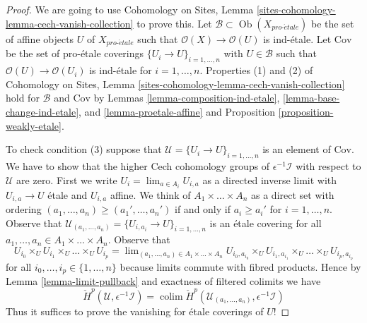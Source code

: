 \documentclass[10pt,a4paper]{amsart}
\theoremstyle{plain}
\theoremstyle{definition}
\theoremstyle{remark}
\numberwithin{equation}{subsection}
\def\lim{\mathop{\mathrm{lim}}\nolimits}
\def\colim{\mathop{\mathrm{colim}}\nolimits}
\def\Ob{\mathop{\mathrm{Ob}}\nolimits}
\def\proetale{{pro\text{-}\acute{e}tale}}
\begin{document}
\begin{proof}
We are going to use
Cohomology on Sites, Lemma \ref{sites-cohomology-lemma-cech-vanish-collection}
to prove this. Let $\mathcal{B} \subset \Ob(X_\proetale)$ be the set of affine
objects $U$ of $X_\proetale$ such that $\mathcal{O}(X) \to \mathcal{O}(U)$ is
ind-\'etale. Let $\text{Cov}$ be the set of pro-\'etale coverings
$\{U_i \to U\}_{i = 1, \ldots, n}$ with $U \in \mathcal{B}$ such that
$\mathcal{O}(U) \to \mathcal{O}(U_i)$ is ind-\'etale for $i = 1, \ldots, n$.
Properties (1) and (2) of
Cohomology on Sites, Lemma \ref{sites-cohomology-lemma-cech-vanish-collection}
hold for $\mathcal{B}$ and $\text{Cov}$ by
Lemmas \ref{lemma-composition-ind-etale},
\ref{lemma-base-change-ind-etale}, and
\ref{lemma-proetale-affine} and
Proposition \ref{proposition-weakly-etale}.

\medskip\noindent
To check condition (3) suppose that
$\mathcal{U} = \{U_i \to U\}_{i = 1, \ldots, n}$
is an element of $\text{Cov}$. We have to show that the higher
Cech cohomology groups of $\epsilon^{-1}\mathcal{I}$
with respect to $\mathcal{U}$ are zero.
First we write $U_i = \lim_{a \in A_i} U_{i, a}$ as a directed inverse limit
with $U_{i, a} \to U$ \'etale and $U_{i, a}$ affine.
We think of $A_1 \times \ldots \times A_n$ as a direct set
with ordering $(a_1, \ldots, a_n) \geq (a_1', \ldots, a_n')$
if and only if $a_i \geq a_i'$ for $i = 1, \ldots, n$.
Observe that
$\mathcal{U}_{(a_1, \ldots, a_n)} = \{U_{i, a_i} \to U\}_{i = 1, \ldots, n}$
is an \'etale covering for all
$a_1, \ldots, a_n \in A_1 \times \ldots \times A_n$.
Observe that
$$
U_{i_0} \times_U U_{i_1} \times_U \ldots \times_U U_{i_p}
=
\lim_{(a_1, \ldots, a_n) \in A_1 \times \ldots \times A_n}
U_{i_0, a_{i_0}} \times_U
U_{i_1, a_{i_1}} \times_U \ldots \times_U U_{i_p, a_{i_p}}
$$
for all $i_0, \ldots, i_p \in \{1, \ldots, n\}$ because limits
commute with fibred products. Hence by Lemma \ref{lemma-limit-pullback}
and exactness of filtered colimits we have
$$
\check{H}^p(\mathcal{U}, \epsilon^{-1}\mathcal{I}) =
\colim \check{H}^p(\mathcal{U}_{(a_1, \ldots, a_n)}, \epsilon^{-1}\mathcal{I}) 
$$
Thus it suffices to prove the vanishing for \'etale coverings
of $U$!


\end{proof}
\end{document}
